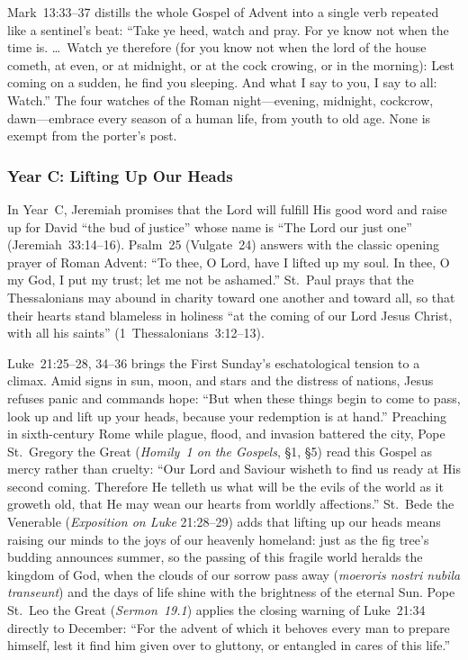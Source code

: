 Mark~13:33--37 distills the whole Gospel of Advent into a single verb repeated like a sentinel's beat: ``Take ye heed, watch and pray. For ye know not when the time is. \dots\ Watch ye therefore (for you know not when the lord of the house cometh, at even, or at midnight, or at the cock crowing, or in the morning): Lest coming on a sudden, he find you sleeping. And what I say to you, I say to all: Watch.'' The four watches of the Roman night---evening, midnight, cockcrow, dawn---embrace every season of a human life, from youth to old age. None is exempt from the porter's post.

\subsubsection{Year C: Lifting Up Our Heads}

In Year~C, Jeremiah promises that the Lord will fulfill His good word and raise up for David ``the bud of justice'' whose name is ``The Lord our just one'' (Jeremiah~33:14--16). Psalm~25 (Vulgate~24) answers with the classic opening prayer of Roman Advent: ``To thee, O Lord, have I lifted up my soul. In thee, O my God, I put my trust; let me not be ashamed.'' St.~Paul prays that the Thessalonians may abound in charity toward one another and toward all, so that their hearts stand blameless in holiness ``at the coming of our Lord Jesus Christ, with all his saints'' (1~Thessalonians~3:12--13).

Luke~21:25--28, 34--36 brings the First Sunday's eschatological tension to a climax. Amid signs in sun, moon, and stars and the distress of nations, Jesus refuses panic and commands hope: ``But when these things begin to come to pass, look up and lift up your heads, because your redemption is at hand.'' Preaching in sixth-century Rome while plague, flood, and invasion battered the city, Pope St.~Gregory the Great (\textit{Homily~1 on the Gospels}, \S1, \S5) read this Gospel as mercy rather than cruelty: ``Our Lord and Saviour wisheth to find us ready at His second coming. Therefore He telleth us what will be the evils of the world as it groweth old, that He may wean our hearts from worldly affections.'' St.~Bede the Venerable (\textit{Exposition on Luke} 21:28--29) adds that lifting up our heads means raising our minds to the joys of our heavenly homeland: just as the fig tree's budding announces summer, so the passing of this fragile world heralds the kingdom of God, when the clouds of our sorrow pass away (\textit{moeroris nostri nubila transeunt}) and the days of life shine with the brightness of the eternal Sun. Pope St.~Leo the Great (\textit{Sermon~19.1}) applies the closing warning of Luke~21:34 directly to December: ``For the advent of which it behoves every man to prepare himself, lest it find him given over to gluttony, or entangled in cares of this life.''

